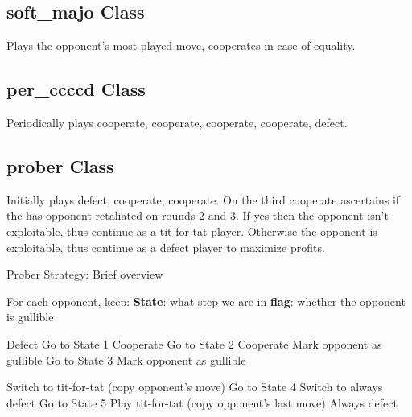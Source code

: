 \documentclass[12pt]{report}
\begin{document}
\subsection{soft\_majo Class}
Plays the opponent's most played move, cooperates in case of equality.
\subsection{per\_ccccd Class}
Periodically plays cooperate, cooperate, cooperate, cooperate, defect.
\subsection{prober Class}
Initially plays defect, cooperate, cooperate. On the third cooperate ascertains if the has opponent retaliated on rounds 2 and 3. If yes then the opponent isn't exploitable, thus continue as a tit-for-tat player. Otherwise the opponent is exploitable, thus continue as a defect player to maximize profits.
\begin{algorithm}
\caption{Prober Strategy: Brief overview}
\begin{algorithmic}[1]
\State For each opponent, keep:
\State \quad \textbf{State}: what step we are in
\State \quad \textbf{flag}: whether the opponent is gullible


    \State Defect
    \State Go to State 1
    \State Cooperate
    \State Go to State 2
    \State Cooperate
        \State Mark opponent as gullible
    \EndIf
    \State Go to State 3
        \State Mark opponent as gullible
    \EndIf

        \State Switch to tit-for-tat (copy opponent's move)
        \State Go to State 4
    \Else
        \State Switch to always defect
        \State Go to State 5
    \EndIf
{}
    \State Play tit-for-tat (copy opponent's last move)
    \State Always defect
\EndIf

\EndFunction
\end{algorithmic}    
\end{algorithm}
\newpage
\end{document}
